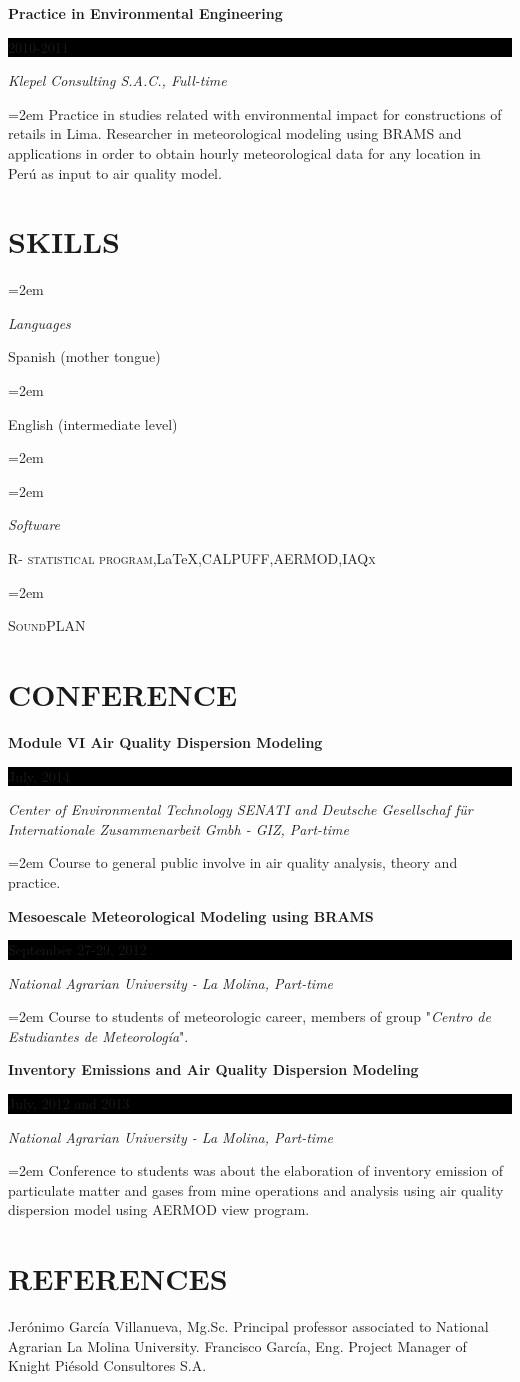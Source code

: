 \documentclass[paper=a4,fontsize=11pt]{scrartcl} %
\newlength{\spacebox}
\newcommand{\sepspace}{\vspace*{1em}}		%
\newcommand{\NewPart}[1]{\section*{\uppercase{#1}}}
\newcommand{\PersonalEntry}[2]{
		\noindent\hangindent=2em\hangafter=0 %
		\parbox{\spacebox}{        %
		\textit{#1}}		       %
		\hspace{1.5em} #2 \par}    %
\newcommand{\SkillsEntry}[2]{      %
		\noindent\hangindent=2em\hangafter=0 %
		\parbox{\spacebox}{        %
		\textit{#1}}			   %
		\hspace{1.5em} #2 \par}    %
\newcommand{\EducationEntry}[4]{
		\noindent \textbf{#1} \hfill      %
		\colorbox{Black}{%
			\parbox{6em}{%
			\hfill\color{White}#2}} \par  %
		\noindent \textit{#3} \par        %
		\noindent\hangindent=2em\hangafter=0 \small #4 %
		\normalsize \par}
\begin{document}
\EducationEntry{Practice in Environmental Engineering}{2010-2011}{Klepel Consulting S.A.C., Full-time}{Practice in studies related with environmental impact for constructions of retails in Lima. Researcher in meteorological modeling using BRAMS and applications in order to obtain hourly meteorological data for any location in Perú as input to air quality model.}
\sepspace
\sepspace
\sepspace
\sepspace

\NewPart{Skills}{}

\SkillsEntry{Languages}{Spanish (mother tongue)}
\SkillsEntry{}{English (intermediate level)}
\SkillsEntry{}{}

\SkillsEntry{Software}{\textsc{R- statistical program},\LaTeX,\textsc{CALPUFF},\textsc{AERMOD},\textsc{IAQx}}
\SkillsEntry{} {\textsc{SoundPLAN}}

\NewPart{Conference}{}

\EducationEntry{Module VI Air Quality Dispersion Modeling}{July, 2014}{Center of Environmental Technology SENATI and Deutsche Gesellschaf für Internationale Zusammenarbeit Gmbh - GIZ, Part-time}{Course to general public involve in air quality analysis, theory and practice.}
\sepspace

\EducationEntry{Mesoescale Meteorological Modeling using BRAMS}{September 27-29, 2012}{National Agrarian University - La Molina, Part-time}{Course to students of meteorologic career, members of group "\textit{Centro de Estudiantes de Meteorología}".}
\sepspace

\EducationEntry{Inventory Emissions and Air Quality Dispersion Modeling}{July, 2012 and 2013}{National Agrarian University - La Molina, Part-time}{Conference to students was about the elaboration of inventory emission of particulate matter and gases from mine operations and analysis using air quality dispersion model using AERMOD view program.}
\sepspace

\NewPart{References}{}
Jerónimo García Villanueva, Mg.Sc. Principal professor associated to National Agrarian La Molina University.
\sepspace
Francisco García, Eng. Project Manager of Knight Piésold Consultores S.A.
\end{document}
